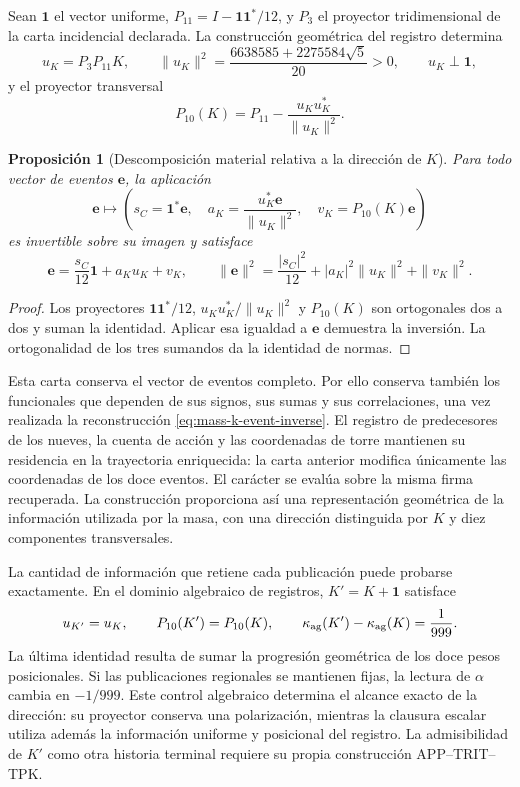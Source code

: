 \documentclass[a4paper,10pt]{article}
\newtheorem{proposition}[theorem]{Proposición}
\theoremstyle{definition}\newtheorem{definition}[theorem]{Definición}
\theoremstyle{remark}\newtheorem{remark}[theorem]{Observación}
\numberwithin{equation}{section}
\begin{document}
Sean \(\mathbf1\) el vector uniforme,
\(P_{11}=I-\mathbf1\mathbf1^*/12\), y \(P_3\) el proyector
tridimensional de la carta incidencial declarada. La construcción
geométrica del registro determina
\[
 u_K=P_3P_{11}K,\qquad
 \|u_K\|^2=\frac{6638585+2275584\sqrt5}{20}>0,
 \qquad u_K\perp\mathbf1,
\]
y el proyector transversal
\[
 P_{10}(K)=P_{11}-\frac{u_Ku_K^*}{\|u_K\|^2}.
\]

\begin{proposition}[Descomposición material relativa a la dirección de \(K\)]
Para todo vector de eventos \(\mathbf e\), la aplicación
\begin{equation}
 \mathbf e\longmapsto
 \left(s_C=\mathbf1^*\mathbf e,\quad
       a_K=\frac{u_K^*\mathbf e}{\|u_K\|^2},\quad
       v_K=P_{10}(K)\mathbf e\right)
 \label{eq:mass-k-event-chart}
\end{equation}
es invertible sobre su imagen y satisface
\begin{equation}
 \mathbf e=\frac{s_C}{12}\mathbf1+a_Ku_K+v_K,
 \qquad
 \|\mathbf e\|^2=\frac{|s_C|^2}{12}
          +|a_K|^2\|u_K\|^2+\|v_K\|^2.
 \label{eq:mass-k-event-inverse}
\end{equation}
\end{proposition}
\begin{proof}
Los proyectores \(\mathbf1\mathbf1^*/12\),
\(u_Ku_K^*/\|u_K\|^2\) y \(P_{10}(K)\) son ortogonales dos a
dos y suman la identidad. Aplicar esa igualdad a \(\mathbf e\)
demuestra la inversión. La ortogonalidad de los tres sumandos da la
identidad de normas.
\end{proof}

Esta carta conserva el vector de eventos completo. Por ello conserva
también los funcionales que dependen de sus signos, sus sumas y sus
correlaciones, una vez realizada la reconstrucción
\eqref{eq:mass-k-event-inverse}. El registro de predecesores de los nueves,
la cuenta de acción y las coordenadas de torre mantienen su residencia
en la trayectoria enriquecida: la carta anterior modifica únicamente
las coordenadas de los doce eventos. El carácter se evalúa sobre la misma
firma recuperada. La construcción proporciona así una representación
geométrica de la información utilizada por la masa, con una dirección
distinguida por \(K\) y diez componentes transversales.

La cantidad de información que retiene cada publicación puede probarse
exactamente. En el dominio algebraico de registros, \(K'=K+\mathbf1\)
satisface
\[
 u_{K'}=u_K,\qquad P_{10}(K')=P_{10}(K),\qquad
 \kappa_{\rm ag}(K')-\kappa_{\rm ag}(K)=\frac1{999}.
\]
La última identidad resulta de sumar la progresión geométrica de los
doce pesos posicionales. Si las publicaciones regionales se mantienen
fijas, la lectura de \(\alpha\) cambia en \(-1/999\).
Este control algebraico determina el alcance exacto de la dirección:
su proyector conserva una polarización, mientras la clausura escalar
utiliza además la información uniforme y posicional del registro.
La admisibilidad de \(K'\) como otra historia terminal requiere su
propia construcción APP--TRIT--TPK.
\end{document}
